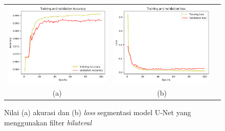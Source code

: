 \begin{enumerate}
	
	\begin{figure}[htbp]
		\centering
		\begin{tabular}{ccc}
			\includegraphics[scale=0.5]{bab4/acc-bilateral-unet.png} & 
			\includegraphics[scale=0.5]{bab4/loss-bilateral-unet.png} & \\
			(a)&(b)    %
		\end{tabular}
		\caption{Nilai (a) akurasi dan (b) \textit{loss} segmentasi model U-Net yang menggunakan filter \textit{bilateral}}
		\label{fig:performance-bilateral-unet}
	\end{figure}
	

\end{enumerate}
